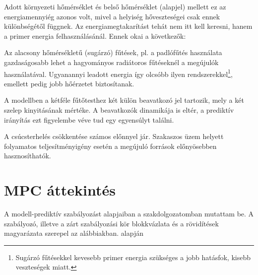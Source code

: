 Adott környezeti hőmérséklet és belső hőmérséklet (alapjel) mellett ez az energiamennyiég azonos volt, mivel a helyiség hőveszteségei csak ennek különbségétől függnek. Az energiamegtakarítást tehát nem itt kell keresni, hanem a primer energia felhasználásánál. Ennek okai a következők:

Az alacsony hőmérsékletű (sugárzó) fűtések, pl. a padlófűtés használata gazdaságosabb lehet a hagyományos radiátoros fűtéseknél a megújulók használatával. Ugyanannyi leadott energia így olcsóbb ilyen rendszerekkel\footnote{Sugárzó fűtésekkel kevesebb primer energia szükséges a jobb hatásfok, kisebb veszteségek miatt.}, emellett pedig jobb hőérzetet biztosítanak.

A modellben a kétféle fűtőtesthez két külön beavatkozó jel tartozik, mely a két szelep kinyitásának mértéke. A beavatkozók dinamikája is eltér, a prediktív irányítás ezt figyelembe véve tud egy egyensúlyt találni.

A csúcsterhelés csökkentése számos előnnyel jár. Szakaszos üzem helyett folyamatos teljesítményigény esetén a megújuló források előnyösebben hasznosíthatók. 

\section{MPC áttekintés}

A modell-prediktív szabályozást alapjaiban a szakdolgozatomban mutattam be. A szabályozó, illetve a zárt szabályozási kör blokkvázlata és a rövidítések magyarázata szerepel az alábbiakban.
\cite{MPCtoolboxGuide} alapján



\vspace{6pt}

